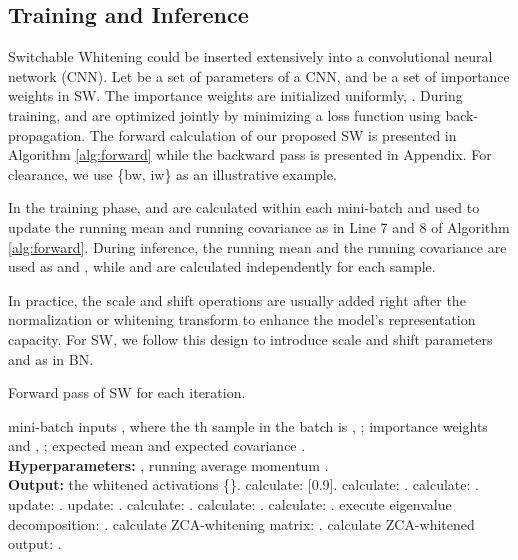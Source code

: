 \documentclass[10pt,twocolumn,letterpaper]{article}
\begin{document}
\subsection{Training and Inference}

Switchable Whitening could be inserted extensively into a convolutional neural network (CNN).
Let  be a set of parameters of a CNN, and  be a set of importance weights in SW.
The importance weights are initialized uniformly, \eg .
During training,  and  are optimized jointly by minimizing a loss function  using back-propagation.
The forward calculation of our proposed SW is presented in Algorithm \ref{alg:forward} while the backward pass is presented in Appendix.
For clearance, we use  \{bw, iw\} as an illustrative example.

In the training phase,  and  are calculated within each mini-batch and used to update the running mean and running covariance as in Line 7 and 8 of Algorithm \ref{alg:forward}.
During inference, the running mean and the running covariance are used as  and , while  and  are calculated independently for each sample.


In practice, the scale and shift operations are usually added right after the normalization or whitening transform to enhance the model's representation capacity.
For SW, we follow this design to introduce scale and shift parameters  and  as in BN.


\begin{algorithm}[t!]
\caption{Forward pass of SW for each iteration.}
	\label{alg:forward}
	{\fontsize{9}{9} \selectfont
		\begin{algorithmic}[1]
			 mini-batch inputs \scalebox{0.9}{}, where the th sample in the batch is \scalebox{0.9}{}, \scalebox{0.9}{}; importance weights \scalebox{0.9}{} and \scalebox{0.9}{}, \scalebox{0.9}{}; expected mean \scalebox{0.9}{} and expected covariance \scalebox{0.9}{}. \\
{\bfseries Hyperparameters:} , running average momentum . \\
{\bfseries Output:} the whitened activations \{\scalebox{0.9}{}\}.
\State calculate: \scalebox{0.8}[0.9]{}.
\State calculate: \scalebox{0.9}{}.
\State calculate: \scalebox{0.9}{}.
\State update: \scalebox{0.9}{}.
\State update: \scalebox{0.9}{}.
			\State calculate: \scalebox{0.9}{}.
\State calculate: \scalebox{0.9}{}.
\State calculate: \scalebox{0.9}{, , }.
\State execute eigenvalue decomposition: \scalebox{0.9}{}.
\State calculate ZCA-whitening matrix: \scalebox{0.9}{}.
\State calculate ZCA-whitened output: \scalebox{0.88}{}.
			\EndFor
		\end{algorithmic}
	}
\end{algorithm}
\end{document}
